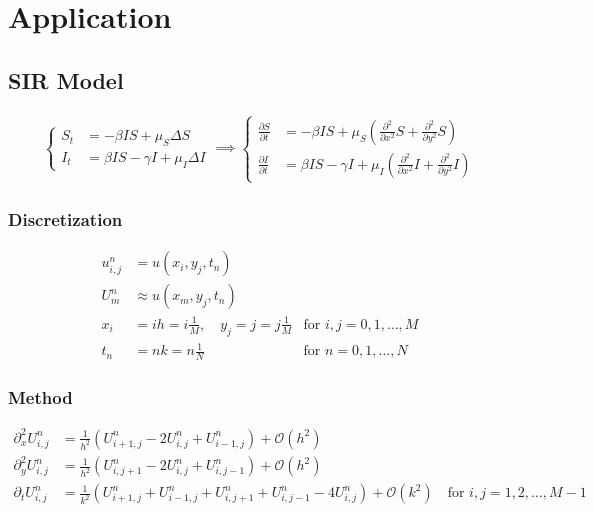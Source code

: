 \chapter{Application}

\section{SIR Model}
\begin{align}
  \begin{cases}
    S_t & = -\beta IS + \mu_S \Delta S           \\
    I_t & = \beta IS - \gamma I + \mu_I \Delta I
  \end{cases}
  \implies
  \begin{cases}
    \frac{\partial S}{\partial t} & = -\beta IS + \mu_S\left(\frac{\partial^2 }{\partial x^2}S + \frac{\partial^2 }{\partial y^2} S \right)            \\
    \frac{\partial I}{\partial t} & = \beta IS - \gamma I + \mu_I \left(\frac{\partial^2 }{\partial x^2}I  + \frac{\partial^2 }{\partial y^2} I\right)
  \end{cases}
\end{align}

\subsection{Discretization}

\begin{align*}
  u_{i,j}^n & = u(x_i,y_j,t_n) \tag{exact}                                                       \\
  U_m^n     & \approx u(x_m,y_j,t_n) \tag{approx}                                                \\
  x_i       & = ih = i\frac{1}{M}, \quad y_j = j = j\frac{1}{M} & \text{for } i,j = 0,1,\ldots,M \\
  t_n       & = nk = n\frac{1}{N}                               & \text{for } n = 0,1,\ldots,N
\end{align*}

\subsection{Method}
\begin{align*}
  \partial_x^2 U_{i,j}^n & = \frac{1}{h^2} \left(U_{i+1,j}^n - 2U_{i,j}^n + U_{i-1,j}^n \right) + \mathcal{O}(h^2)                                                                   \\
  \partial_y^2 U_{i,j}^n & = \frac{1}{h^2} \left(U_{i,j+1}^n - 2U_{i,j}^n + U_{i,j-1}^n\right) + \mathcal{O}(h^2)                                                                    \\
  \partial_t U_{i,j}^n   & = \frac{1}{k^2} \left(U_{i+1,j}^n + U_{i-1,j}^n + U_{i,j+1}^n + U_{i,j-1}^n - 4U_{i,j}^n\right) + \mathcal{O}(k^2) \quad \text{for } i,j = 1,2,\ldots,M-1
\end{align*}

